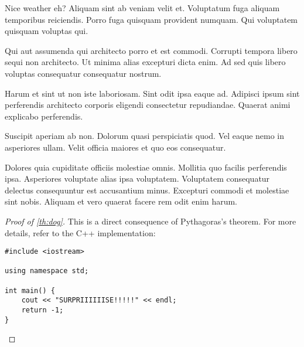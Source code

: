 \documentclass[10pt, final]{book}
\begin{document}
Nice weather eh? Aliquam sint ab veniam velit et. Voluptatum fuga aliquam temporibus reiciendis. Porro fuga quisquam provident numquam. Qui voluptatem quisquam voluptas qui.

Qui aut assumenda qui architecto porro et est commodi. Corrupti tempora libero sequi non architecto. Ut minima alias excepturi dicta enim. Ad sed quis libero voluptas consequatur consequatur nostrum.

Harum et sint ut non iste laboriosam. Sint odit ipsa eaque ad. Adipisci ipsum sint perferendis architecto corporis eligendi consectetur repudiandae. Quaerat animi explicabo perferendis.

Suscipit aperiam ab non. Dolorum quasi perspiciatis quod. Vel eaque nemo in asperiores ullam. Velit officia maiores et quo eos consequatur.

Dolores quia cupiditate officiis molestiae omnis. Mollitia quo facilis perferendis ipsa. Asperiores voluptate alias ipsa voluptatem. Voluptatem consequatur delectus consequuntur est accusantium minus. Excepturi commodi et molestiae sint nobis. Aliquam et vero quaerat facere rem odit enim harum.


\begin{proof} [Proof of \ref{th:dog}]
    This is a direct consequence of Pythagoras's theorem. For more details, refer to the C++ implementation:
    \begin{verbatim}
#include <iostream>

using namespace std;

int main() {
    cout << "SURPRIIIIIISE!!!!!" << endl;
    return -1;
}
    \end{verbatim}
\end{proof}

\nocite{*}



\printindex
\end{document}
